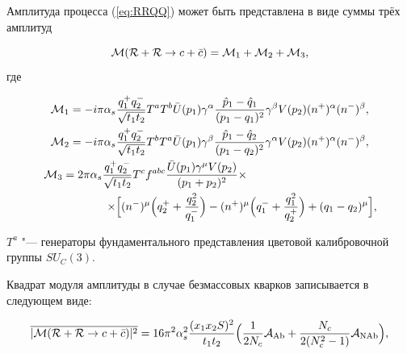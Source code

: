 Амплитуда процесса (\ref{eq:RRQQ}) может быть представлена в виде суммы трёх амплитуд 

$${\cal M}(\mathcal{R}+\mathcal{R}\to

c+\bar c)={\mathcal M}_1+{\mathcal M}_2+{\mathcal M}_3,$$ где

\begin{gather}

{\mathcal M}_1=-i  \pi \alpha_s \frac{q_1^+ q_2^-}{\sqrt{t_1 t_2}}

T^aT^b \bar U(p_1) \gamma^\alpha\frac{\hat p_1-\hat

q_1}{(p_1-q_1)^2}\gamma^\beta V(p_2)(n^+)^\alpha(n^-)^\beta,

\\

{\mathcal M}_2=-i \pi \alpha_s \frac{q_1^+ q_2^-}{\sqrt{t_1 t_2}}

T^bT^a\bar U(p_1) \gamma^\beta\frac{\hat p_1-\hat

q_2}{(p_1-q_2)^2}\gamma^\alpha

V(p_2)(n^+)^\alpha(n^-)^\beta,\\  \label{eq:ampRRQQ}

{\mathcal

M}_3=2 \pi \alpha_s \frac{q_1^+ q_2^-}{\sqrt{t_1 t_2}}

T^cf^{abc}\frac{\bar U(p_1)\gamma^\mu V(p_2)}{(p_1+p_2)^2}\times \hspace{4cm} \\

\hspace{2cm}

\times \Bigl[(n^-)^\mu \Bigl(q_2^++\frac{q_2^2}{q_1^-}\Bigr)-(n^+)^\mu\Bigl(q_1^-+\frac{q_1^2}{q_2^+}\Bigr)+(q_1-q_2)^\mu\Bigr],

\end{gather}

$T^a$ "--- генераторы фундаментального представления цветовой калибровочной группы $SU_C(3)$.



Квадрат модуля амплитуды в случае безмассовых кварков записывается в следующем виде:

\begin{equation}

\overline{|{\mathcal M}(\mathcal{R}+\mathcal{R} \to c + \bar c)|^2}

= 16 \pi^2 \alpha_s^2 \frac{(x_{1}x_{2}S)^{2}}{t_{1}t_{2}} 

\Bigl( \frac{1}{2 N_c} {\cal A}_{\mathrm{Ab}}

+ \frac{N_c}{2 (N_c^2 - 1)} {\cal A}_{\mathrm{NAb}} \Bigr), \label{sqamp:RRQQ}

\end{equation}

